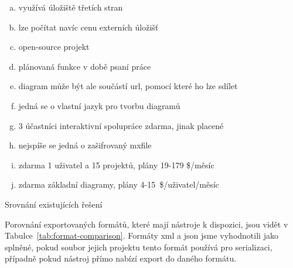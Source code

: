 \begin{table}[htb]
  \footnotesize
  \begin{enumerate}[a.,ref = \alph*,noitemsep]
    \item využívá úložiště třetích stran \label{tab:gc:external-storage}
    \item lze počítat navíc cenu externích úložišť \label{tab:gc:price-external-storage}
    \item open-source projekt\label{tab:gc:open-source}
    \item plánovaná funkce v době psaní práce\label{tab:gc:plan}
    \item diagram může být ale součástí \acrshort{url}, pomocí které ho lze sdílet\label{tab:gc:in-url}
    \item jedná se o vlastní jazyk pro tvorbu diagramů\label{tab:gc:custom-lang}
    \item 3 účastníci interaktivní spolupráce zdarma, jinak placené\label{tab:gc:vpo-collab}
    \item nejspíše se jedná o zašifrovaný mxfile\label{tab:gc:mxfile-like}
    \item zdarma 1 uživatel a 15 projektů, plány 19-179 \$/měsíc\label{tab:gc:price-drawsql}
    \item zdarma základní diagramy, plány 4-15~\$/uživatel/měsíc\label{tab:gc:price-vpo}
  \end{enumerate}

  \caption{Srovnání existujících řešení}
  \label{tab:general-comparison}
\end{table}

Porovnání exportovaných formátů, které mají nástroje k dispozici, jsou vidět v Tabulce~\ref{tab:format-comparison}.
Formáty \acrshort{xml} a \acrshort{json} jsme vyhodnotili jako splněné, pokud soubor jejich projektu tento formát používá pro serializaci, případně pokud nástroj přímo nabízí export do daného formátu.

